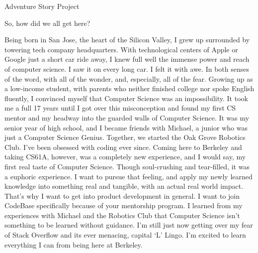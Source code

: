 \documentclass{article}
\begin{document}
\Huge Adventure Story Project

So, how did we all get here?

Being born in San Jose, the heart of the Silicon Valley, I grew up surrounded by towering tech company headquarters. With technological centers of Apple or Google just a short car ride away, I knew full well  the immense power and reach of computer science. I saw it on every long car. I felt it with awe. In both senses of the word, with all of the wonder, and, especially, all of the fear. Growing up as a low-income student, with parents who neither finished college nor spoke English fluently, I convinced myself that Computer Science was an impossibility. It took me a full 17 years until I got over this misconception and found my first CS mentor and my headway into the guarded walls of Computer Science. It was my senior year of high school, and I became friends with Michael, a junior who was just a Computer Science Genius. Together, we started the Oak Grove Robotics Club. I’ve been obsessed with coding ever since. Coming here to Berkeley and taking CS61A, however, was a completely new experience, and I would say, my first real taste of Computer Science. Though soul-crushing and tear-filled, it was a euphoric experience. I want to pursue that feeling, and apply my newly learned knowledge into something real and tangible, with an actual real world impact. That’s why I want to get into product development in general. I want to join CodeBase specifically because of your mentorship program. I learned from my experiences with Michael and the Robotics Club that Computer Science isn’t something to be learned without guidance. I’m still just now getting over my fear of Stack Overflow and its ever menacing, capital ‘L’ Lingo. I'm excited to learn everything I can from being here at Berkeley.
\end{document}
